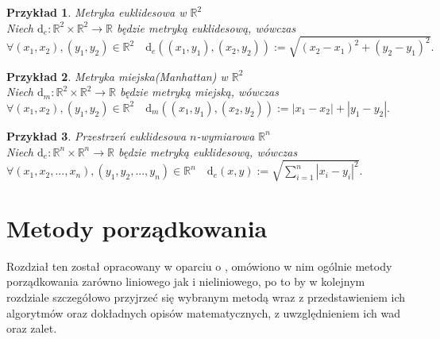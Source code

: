 \documentclass[12pt,a4paper]{report}
\newtheorem{example}{Przykład}
\begin{document}
\begin{example}{Metryka euklidesowa w $\mathbb{R}^2$}\\
Niech $\mathrm{d}_e: \mathbb{R}^2 \times \mathbb{R}^2 \rightarrow \mathbb{R}$ będzie metryką euklidesową, wówczas \\$\forall{(x_{1},x_{2}),(y_{1},y_{2}) \in \mathbb{R}^2} \quad \mathrm{d}_e((x_1,y_1),(x_2,y_2)):= \sqrt{(x_2-x_1)^2+(y_2-y_1)^2}. $
\end{example}

\begin{example}{Metryka miejska(Manhattan) w $\mathbb{R}^2$}\\
Niech $\mathrm{d}_m: \mathbb{R}^2 \times \mathbb{R}^2 \rightarrow \mathbb{R}$ będzie metryką miejską, wówczas \\
$\forall{(x_{1},x_{2}),(y_{1},y_{2}) \in \mathbb{R}^2} \quad \mathrm{d}_m((x_1,y_1),(x_2,y_2)):=|x_1-x_2|+|y_1-y_2|.$\\
\end{example}

\begin{example}{Przestrzeń euklidesowa $n$-wymiarowa $\mathbb{R}^n$\\}
Niech $\mathrm{d}_e: \mathbb{R}^n \times \mathbb{R}^n \rightarrow \mathbb{R}$ będzie metryką euklidesową, wówczas\\   $\forall{(x_1,x_2,...,x_n),(y_1,y_2,...,y_n) \in \mathbb{R}^n} \quad \mathrm{d}_e(x,y):= \sqrt{\sum_{i=1}^{n} |x_i-y_i|^2}.$\
\end{example}



\chapter{Metody porządkowania}
\noindent

Rozdział ten został opracowany w oparciu o \cite[Rozdział 2]{panek2013}, omówiono w nim ogólnie metody porządkowania zarówno liniowego jak i nieliniowego, po to by w kolejnym rozdziale szczegółowo przyjrzeć się wybranym metodą wraz z przedstawieniem ich algorytmów oraz dokładnych opisów matematycznych, z uwzględnieniem ich wad oraz zalet.
\end{document}
